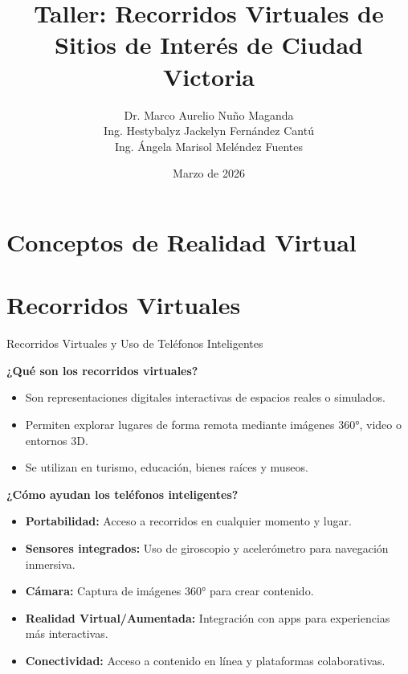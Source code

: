 \documentclass[aspectratio=169,compress]{beamer}
\title{Taller: Recorridos Virtuales de Sitios de Interés de Ciudad Victoria} %
\author{Dr. Marco Aurelio Nu\~no Maganda\\Ing. Hestybalyz Jackelyn Fernández Cantú\\
Ing. Ángela Marisol Meléndez Fuentes}
\institute{Universidad Politécnica de Victoria\\ Laboratorio de Sistemas Inteligentes/Maestría en Ingeniería \\
mnunom@upv.edu.mx  \vspace{.25cm} }
\date{Marzo de 2026}
\begin{document}
\frame{
	\begin{titlepage}
	\end{titlepage}
	
}






\section[RV]{Conceptos de Realidad Virtual}


\section[PRV]{Recorridos Virtuales}

\begin{frame}{Recorridos Virtuales y Uso de Teléfonos Inteligentes}

\textbf{¿Qué son los recorridos virtuales?}
\begin{itemize}
    \item Son representaciones digitales interactivas de espacios reales o simulados.
    \item Permiten explorar lugares de forma remota mediante imágenes 360°, video o entornos 3D.
    \item Se utilizan en turismo, educación, bienes raíces y museos.
\end{itemize}

\vspace{0.5cm}

\textbf{¿Cómo ayudan los teléfonos inteligentes?}
\begin{itemize}
    \item \textbf{Portabilidad:} Acceso a recorridos en cualquier momento y lugar.
    \item \textbf{Sensores integrados:} Uso de giroscopio y acelerómetro para navegación inmersiva.
    \item \textbf{Cámara:} Captura de imágenes 360° para crear contenido.
    \item \textbf{Realidad Virtual/Aumentada:} Integración con apps para experiencias más interactivas.
    \item \textbf{Conectividad:} Acceso a contenido en línea y plataformas colaborativas.
\end{itemize}

\end{frame}
\end{document}
